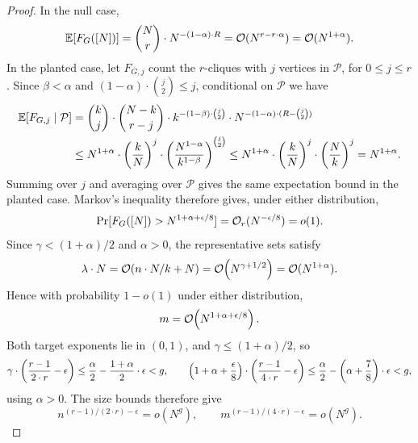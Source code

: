 \begin{proof}
    In the null case,
    \[
        \mathbb{E}[F_G([N])]=\binom{N}{r}\cdot N^{-(1-\alpha)\cdot R}
        =\mathcal{O}(N^{r-r\cdot\alpha})=\mathcal{O}(N^{1+\alpha}).
    \]
    In the planted case, let $F_{G,j}$ count the $r$-cliques with $j$ vertices in $\mathcal P$, for $0\leq j\leq r$. Since $\beta<\alpha$ and $(1-\alpha)\cdot\binom j2\leq j$, conditional on $\mathcal P$ we have
    \begin{align*}
        \mathbb{E}[F_{G,j}\mid\mathcal P]
        &=\binom{k}{j} \cdot \binom{N-k}{r-j} \cdot k^{-(1-\beta)\cdot\binom{j}{2}} \cdot N^{-(1-\alpha)\cdot(R-\binom j2)}\\
        &\leq N^{1+\alpha}\cdot\mathopen{}\left( \frac{k}{N} \right)^j\cdot\mathopen{}\left( \frac{N^{1-\alpha}}{k^{1-\beta}} \right)^{\binom j2}
        \leq N^{1+\alpha}\cdot\mathopen{}\left( \frac{k}{N} \right)^j\cdot\mathopen{}\left( \frac{N}{k} \right)^j
        =N^{1+\alpha}.
    \end{align*}
    Summing over $j$ and averaging over $\mathcal P$ gives the same expectation bound in the planted case. Markov's inequality therefore gives, under either distribution,
    \[
        \Pr[F_G([N])>N^{1+\alpha+\epsilon/8}]=\mathcal{O}_r(N^{-\epsilon/8})=o(1).
    \]
    Since $\gamma<(1+\alpha)/2$ and $\alpha>0$, the representative sets satisfy
    \[
        \lambda \cdot N=\mathcal{O}\mathopen{}\left( n \cdot N/k+N \right)
        =\mathcal{O}\mathopen{}\left( N^{\gamma+1/2} \right)=\mathcal{O}(N^{1+\alpha}).
    \]
    Hence with probability $1-o(1)$ under either distribution,
    \[
        m=\mathcal{O}\mathopen{}\left( N^{1+\alpha+\epsilon/8} \right).
    \]
    Both target exponents lie in $(0,1)$, and $\gamma\leq(1+\alpha)/2$, so
    \[
        \gamma\cdot\mathopen{}\left( \frac{r-1}{2\cdot r}-\epsilon \right)
        \leq\frac\alpha2-\frac{1+\alpha}{2}\cdot\epsilon<g,\qquad
        \mathopen{}\left( 1+\alpha+\frac\epsilon8 \right)\cdot\mathopen{}\left( \frac{r-1}{4\cdot r}-\epsilon \right)
        \leq\frac\alpha2-\mathopen{}\left( \alpha+\frac78 \right)\cdot\epsilon<g,
    \]
    using $\alpha>0$. The size bounds therefore give
    \[
        n^{(r-1)/(2\cdot r)-\epsilon}=o(N^g),\qquad
        m^{(r-1)/(4\cdot r)-\epsilon}=o(N^g).
    \]


\end{proof}
